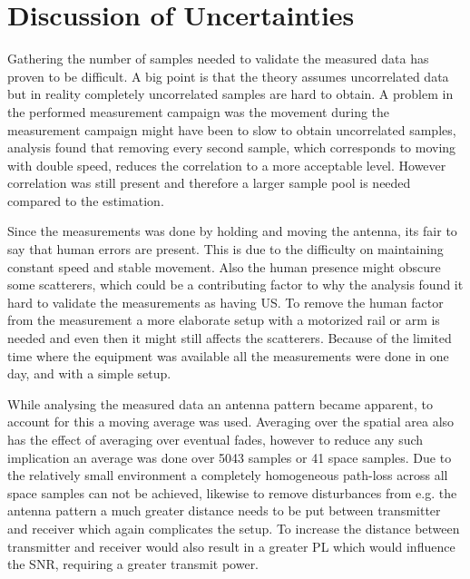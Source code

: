 \chapter{Discussion of Uncertainties}
%
%


Gathering the number of samples needed to validate the measured data has proven to be difficult. A big point is that the theory assumes uncorrelated data but in reality completely uncorrelated samples are hard to obtain. A problem in the performed measurement campaign was the movement during the measurement campaign might have been to slow to obtain uncorrelated samples, analysis found that removing every second sample, which corresponds to moving with double speed, reduces the correlation to a more acceptable level. However correlation was still present and therefore a larger sample pool is needed compared to the estimation. 

Since the measurements was done by holding and moving the antenna, its fair to say that human errors are present. This is due to the difficulty on maintaining constant speed and stable movement. Also the human presence might obscure some scatterers, which could be a contributing factor to why the analysis found it hard to validate the measurements as having \gls{US}. To remove the human factor from the measurement a more elaborate setup with a motorized rail or arm is needed and even then it might still affects the scatterers. Because of the limited time where the equipment was available all the measurements were done in one day, and with a simple setup.

While analysing the measured data an antenna pattern became apparent, to account for this a moving average was used. Averaging over the spatial area also has the effect of averaging over eventual fades, however to reduce any such implication an average was done over 5043 samples or 41 space samples. Due to the relatively small environment a completely homogeneous path-loss across all space samples can not be achieved, likewise to remove disturbances from e.g. the antenna pattern a much greater distance needs to be put between transmitter and receiver which again complicates the setup. To increase the distance between transmitter and receiver would also result in a greater \gls{PL} which would influence the SNR, requiring a greater transmit power.

